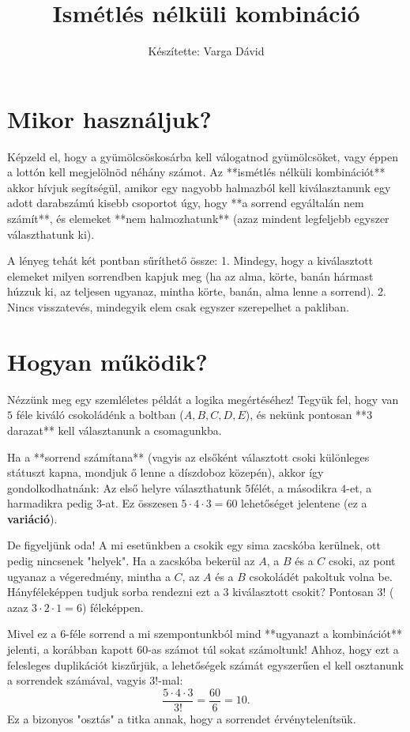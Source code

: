 \documentclass[a4paper,12pt]{article}
\title{Ismétlés nélküli kombináció}
\author{Készítette: Varga Dávid}
\theoremstyle{definition} %
\begin{document}
\maketitle

\section{Mikor használjuk?}
Képzeld el, hogy a gyümölcsöskosárba kell válogatnod gyümölcsöket, vagy éppen a lottón kell megjelölnöd néhány számot. Az **ismétlés nélküli kombinációt** akkor hívjuk segítségül, amikor egy nagyobb halmazból kell kiválasztanunk egy adott darabszámú kisebb csoportot úgy, hogy **a sorrend egyáltalán nem számít**, és elemeket **nem halmozhatunk** (azaz mindent legfeljebb egyszer választhatunk ki). 

A lényeg tehát két pontban sűríthető össze: 
1. Mindegy, hogy a kiválasztott elemeket milyen sorrendben kapjuk meg (ha az alma, körte, banán hármast húzzuk ki, az teljesen ugyanaz, mintha körte, banán, alma lenne a sorrend).
2. Nincs visszatevés, mindegyik elem csak egyszer szerepelhet a pakliban.

\section{Hogyan működik?}
Nézzünk meg egy szemléletes példát a logika megértéséhez! Tegyük fel, hogy van $5$ féle kiváló csokoládénk a boltban ($A, B, C, D, E$), és nekünk pontosan **$3$ darazat** kell választanunk a csomagunkba. 

Ha a **sorrend számítana** (vagyis az elsőként választott csoki különleges státuszt kapna, mondjuk ő lenne a díszdoboz közepén), akkor így gondolkodhatnánk:
Az első helyre választhatunk $5$félét, a másodikra $4$-et, a harmadikra pedig $3$-at. Ez összesen $5 \cdot 4 \cdot 3 = 60$ lehetőséget jelentene (ez a \textbf{variáció}).

De figyeljünk oda! A mi esetünkben a csokik egy sima zacskóba kerülnek, ott pedig nincsenek "helyek". Ha a zacskóba bekerül az $A$, a $B$ és a $C$ csoki, az pont ugyanaz a végeredmény, mintha a $C$, az $A$ és a $B$ csokoládét pakoltuk volna be. Hányféleképpen tudjuk sorba rendezni ezt a $3$ kiválasztott csokit? Pontosan $3!$ ( azaz $3 \cdot 2 \cdot 1 = 6$) féleképpen. 

Mivel ez a $6$-féle sorrend a mi szempontunkból mind **ugyanazt a kombinációt** jelenti, a korábban kapott $60$-as számot túl sokat számoltunk! Ahhoz, hogy ezt a felesleges duplikációt kiszűrjük, a lehetőségek számát egyszerűen el kell osztanunk a sorrendek számával, vagyis $3!$-mal:
$$\frac{5 \cdot 4 \cdot 3}{3!} = \frac{60}{6} = 10.$$
Ez a bizonyos "osztás" a titka annak, hogy a sorrendet érvénytelenítsük.
\end{document}
